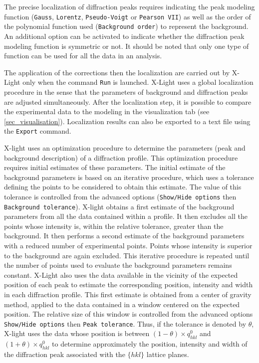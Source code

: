 \documentclass[french,a4paper]{report}
\begin{document}
The precise localization of diffraction peaks requires indicating the peak modeling function (\texttt{Gauss}, \texttt{Lorentz}, \texttt{Pseudo-Voigt} or \texttt{Pearson VII}) as well as the order of the polynomial function used (\texttt{Background order}) to represent the background. An additional option can be activated to indicate whether the diffraction peak modeling function is symmetric or not. It should be noted that only one type of function can be used for all the data in an analysis.

The application of the corrections then the localization are carried out by X-Light only when the command \texttt{Run} is launched. X-Light uses a global localization procedure in the sense that the parameters of background and diffraction peaks are adjusted simultaneously. After the localization step, it is possible to compare the experimental data to the modeling in the visualization tab (see \ref{sec_visualisation}). Localization results can also be exported to a text file using the \texttt{Export} command.

X-light uses an optimization procedure to determine the parameters (peak and background description) of a diffraction profile. This optimization procedure requires initial estimates of these parameters. The initial estimate of the background parameters is based on an iterative procedure, which uses a tolerance defining the points to be considered to obtain this estimate. The value of this tolerance is controlled from the advanced options (\texttt{Show/Hide options} then \texttt{Background tolerance}). X-light obtains a first estimate of the background parameters from all the data contained within a profile. It then excludes all the points whose intensity is, within the relative tolerance, greater than the background. It then performs a second estimate of the background parameters with a reduced number of experimental points. Points whose intensity is superior to the background are again excluded. This iterative procedure is repeated until the number of points used to evaluate the background parameters remains constant. X-Light also uses the data available in the vicinity of the expected position of each peak to estimate the corresponding position, intensity and width in each diffraction profile. This first estimate is obtained from a center of gravity method, applied to the data contained in a window centered on the expected position. The relative size of this window is controlled from the advanced options \texttt{Show/Hide options} then \texttt{Peak tolerance}. Thus, if the tolerance is denoted by $\theta$, X-light uses the data whose position is between $(1-\theta)\times q^0_{hkl}$ and $(1+\theta)\times q^0_{hkl}$ to determine approximately the position, intensity and width of the diffraction peak associated with the $\{hkl\}$ lattice planes.
\end{document}
